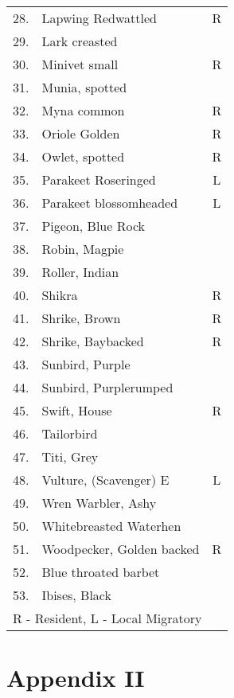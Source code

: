 \begin{longtable}{cp{5cm}c}
28.& Lapwing Redwattled &R \\
29.& Lark creasted &\\
30.& Minivet small &R \\
31.& Munia, spotted & \\
32.& Myna common &R \\
33.& Oriole Golden &R \\
34.& Owlet, spotted &R \\
35.& Parakeet Roseringed &L \\
36.& Parakeet blossomheaded &L\\ 
37.& Pigeon, Blue Rock & \\
38.& Robin, Magpie &\\
39.& Roller, Indian &\\
40.& Shikra &R \\
41.& Shrike, Brown &R \\
42.& Shrike, Baybacked &R \\
43.& Sunbird, Purple & \\
44.& Sunbird, Purplerumped &\\
45.& Swift, House & R\\
46.& Tailorbird & \\
47.& Titi, Grey & \\
48. & Vulture, (Scavenger) E  & L \\ 
49.& Wren Warbler,  Ashy &  \\
50. & Whitebreasted Waterhen & \\ 
51. & Woodpecker, Golden backed & R \\
52. & Blue throated barbet  & \\
53. & Ibises, Black & \\[0.3cm]
\multicolumn{3}{l}{\qquad R - Resident, \qquad L - Local Migratory}
\end{longtable}

\newpage

\chapter*{Appendix II}

